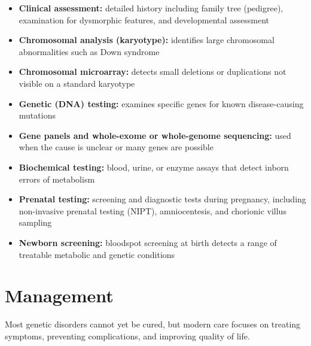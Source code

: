 \begin{itemize}
    \item \textbf{Clinical assessment:} detailed history including family tree (pedigree), examination for dysmorphic features, and developmental assessment
    \item \textbf{Chromosomal analysis (karyotype):} identifies large chromosomal abnormalities such as Down syndrome
    \item \textbf{Chromosomal microarray:} detects small deletions or duplications not visible on a standard karyotype
    \item \textbf{Genetic (DNA) testing:} examines specific genes for known disease-causing mutations
    \item \textbf{Gene panels and whole-exome or whole-genome sequencing:} used when the cause is unclear or many genes are possible
    \item \textbf{Biochemical testing:} blood, urine, or enzyme assays that detect inborn errors of metabolism
    \item \textbf{Prenatal testing:} screening and diagnostic tests during pregnancy, including non-invasive prenatal testing (NIPT), amniocentesis, and chorionic villus sampling
    \item \textbf{Newborn screening:} bloodspot screening at birth detects a range of treatable metabolic and genetic conditions
\end{itemize}

\section*{Management}
Most genetic disorders cannot yet be cured, but modern care focuses on treating symptoms, preventing complications, and improving quality of life.

